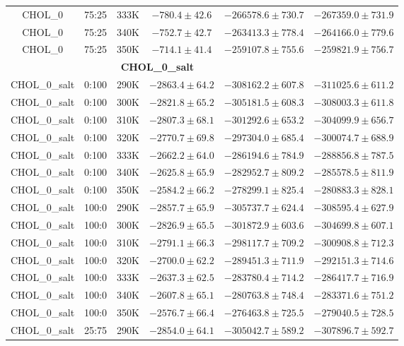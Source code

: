 \begin{longtable}{|c|c|c|c|c|c|}
CHOL\_0 & 75:25 & 333K & $-780.4 \pm 42.6$ & $-266578.6 \pm 730.7$ & $-267359.0 \pm 731.9$ \\
CHOL\_0 & 75:25 & 340K & $-752.7 \pm 42.7$ & $-263413.3 \pm 778.4$ & $-264166.0 \pm 779.6$ \\
CHOL\_0 & 75:25 & 350K & $-714.1 \pm 41.4$ & $-259107.8 \pm 755.6$ & $-259821.9 \pm 756.7$ \\
\midrule \multicolumn{5}{c}{\textbf{CHOL\_0\_salt}} \\ \midrule
CHOL\_0\_salt & 0:100 & 290K & $-2863.4 \pm 64.2$ & $-308162.2 \pm 607.8$ & $-311025.6 \pm 611.2$ \\
CHOL\_0\_salt & 0:100 & 300K & $-2821.8 \pm 65.2$ & $-305181.5 \pm 608.3$ & $-308003.3 \pm 611.8$ \\
CHOL\_0\_salt & 0:100 & 310K & $-2807.3 \pm 68.1$ & $-301292.6 \pm 653.2$ & $-304099.9 \pm 656.7$ \\
CHOL\_0\_salt & 0:100 & 320K & $-2770.7 \pm 69.8$ & $-297304.0 \pm 685.4$ & $-300074.7 \pm 688.9$ \\
CHOL\_0\_salt & 0:100 & 333K & $-2662.2 \pm 64.0$ & $-286194.6 \pm 784.9$ & $-288856.8 \pm 787.5$ \\
CHOL\_0\_salt & 0:100 & 340K & $-2625.8 \pm 65.9$ & $-282952.7 \pm 809.2$ & $-285578.5 \pm 811.9$ \\
CHOL\_0\_salt & 0:100 & 350K & $-2584.2 \pm 66.2$ & $-278299.1 \pm 825.4$ & $-280883.3 \pm 828.1$ \\
CHOL\_0\_salt & 100:0 & 290K & $-2857.7 \pm 65.9$ & $-305737.7 \pm 624.4$ & $-308595.4 \pm 627.9$ \\
CHOL\_0\_salt & 100:0 & 300K & $-2826.9 \pm 65.5$ & $-301872.9 \pm 603.6$ & $-304699.8 \pm 607.1$ \\
CHOL\_0\_salt & 100:0 & 310K & $-2791.1 \pm 66.3$ & $-298117.7 \pm 709.2$ & $-300908.8 \pm 712.3$ \\
CHOL\_0\_salt & 100:0 & 320K & $-2700.0 \pm 62.2$ & $-289451.3 \pm 711.9$ & $-292151.3 \pm 714.6$ \\
CHOL\_0\_salt & 100:0 & 333K & $-2637.3 \pm 62.5$ & $-283780.4 \pm 714.2$ & $-286417.7 \pm 716.9$ \\
CHOL\_0\_salt & 100:0 & 340K & $-2607.8 \pm 65.1$ & $-280763.8 \pm 748.4$ & $-283371.6 \pm 751.2$ \\
CHOL\_0\_salt & 100:0 & 350K & $-2576.7 \pm 66.4$ & $-276463.8 \pm 725.5$ & $-279040.5 \pm 728.5$ \\
CHOL\_0\_salt & 25:75 & 290K & $-2854.0 \pm 64.1$ & $-305042.7 \pm 589.2$ & $-307896.7 \pm 592.7$ \\

\end{longtable}
